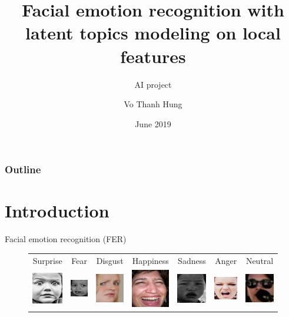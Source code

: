 \documentclass{beamer}
\title{Facial emotion recognition with latent topics modeling on local features}
\subtitle{AI project}
\author{Vo Thanh Hung}
\date{June 2019}
\begin{document}
\begin{frame}[plain,t]
\titlepage
\end{frame}

\begin{frame}%
	\frametitle{Outline}
\tableofcontents
\end{frame}


\section{Introduction}
\begin{frame}{Facial emotion recognition (FER)}

\begin{figure}[h!]
\centering
\begin{tabular}{|c|c|c|c|c|c|c|}
  \hline
  \tiny Surprise & \tiny Fear & \tiny Disgust & \tiny Happiness & \tiny Sadness & \tiny Anger & \tiny Neutral \\
  \includegraphics[width=.1\textwidth]{imgs/train_00006_aligned-1.jpg} &
  \includegraphics[width=.1\textwidth]{imgs/train_00027_aligned-2.jpg} &
  \includegraphics[width=.1\textwidth]{imgs/train_00031_aligned-3.jpg} &
  \includegraphics[width=.1\textwidth]{imgs/train_00016_aligned-4.jpg} &
  \includegraphics[width=.1\textwidth]{imgs/train_00005_aligned-5.jpg} &
  \includegraphics[width=.1\textwidth]{imgs/train_00047_aligned-6.jpg} &
  \includegraphics[width=.1\textwidth]{imgs/train_09757_aligned-7.jpg} \\


\end{tabular}
\end{figure}
\end{frame}
\end{document}

